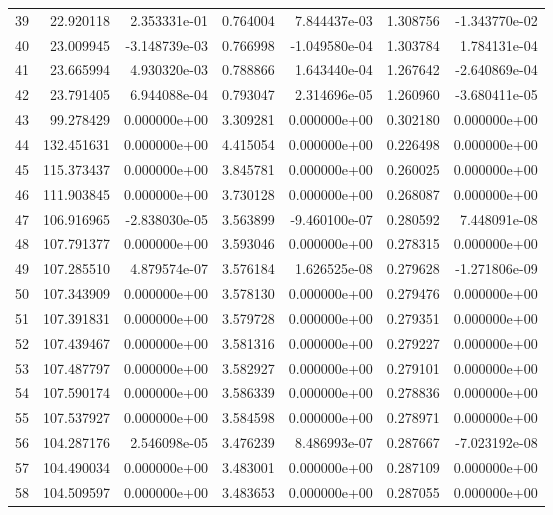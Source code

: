 \begin{tabular}{rrrrrrr}
39 &  22.920118 &  2.353331e-01 &  0.764004 &  7.844437e-03 &   1.308756 & -1.343770e-02 \\
40 &  23.009945 & -3.148739e-03 &  0.766998 & -1.049580e-04 &   1.303784 &  1.784131e-04 \\
41 &  23.665994 &  4.930320e-03 &  0.788866 &  1.643440e-04 &   1.267642 & -2.640869e-04 \\
42 &  23.791405 &  6.944088e-04 &  0.793047 &  2.314696e-05 &   1.260960 & -3.680411e-05 \\
43 &  99.278429 &  0.000000e+00 &  3.309281 &  0.000000e+00 &   0.302180 &  0.000000e+00 \\
44 & 132.451631 &  0.000000e+00 &  4.415054 &  0.000000e+00 &   0.226498 &  0.000000e+00 \\
45 & 115.373437 &  0.000000e+00 &  3.845781 &  0.000000e+00 &   0.260025 &  0.000000e+00 \\
46 & 111.903845 &  0.000000e+00 &  3.730128 &  0.000000e+00 &   0.268087 &  0.000000e+00 \\
47 & 106.916965 & -2.838030e-05 &  3.563899 & -9.460100e-07 &   0.280592 &  7.448091e-08 \\
48 & 107.791377 &  0.000000e+00 &  3.593046 &  0.000000e+00 &   0.278315 &  0.000000e+00 \\
49 & 107.285510 &  4.879574e-07 &  3.576184 &  1.626525e-08 &   0.279628 & -1.271806e-09 \\
50 & 107.343909 &  0.000000e+00 &  3.578130 &  0.000000e+00 &   0.279476 &  0.000000e+00 \\
51 & 107.391831 &  0.000000e+00 &  3.579728 &  0.000000e+00 &   0.279351 &  0.000000e+00 \\
52 & 107.439467 &  0.000000e+00 &  3.581316 &  0.000000e+00 &   0.279227 &  0.000000e+00 \\
53 & 107.487797 &  0.000000e+00 &  3.582927 &  0.000000e+00 &   0.279101 &  0.000000e+00 \\
54 & 107.590174 &  0.000000e+00 &  3.586339 &  0.000000e+00 &   0.278836 &  0.000000e+00 \\
55 & 107.537927 &  0.000000e+00 &  3.584598 &  0.000000e+00 &   0.278971 &  0.000000e+00 \\
56 & 104.287176 &  2.546098e-05 &  3.476239 &  8.486993e-07 &   0.287667 & -7.023192e-08 \\
57 & 104.490034 &  0.000000e+00 &  3.483001 &  0.000000e+00 &   0.287109 &  0.000000e+00 \\
58 & 104.509597 &  0.000000e+00 &  3.483653 &  0.000000e+00 &   0.287055 &  0.000000e+00 \\

\end{tabular}
